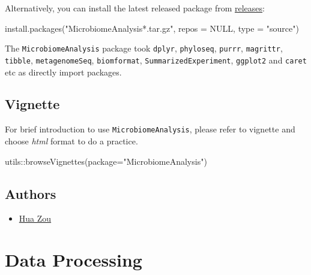 \documentclass[
]{book}
\newenvironment{Shaded}{\begin{snugshade}}{\end{snugshade}}
\newcommand{\AttributeTok}[1]{\textcolor[rgb]{0.77,0.63,0.00}{#1}}
\newcommand{\ConstantTok}[1]{\textcolor[rgb]{0.00,0.00,0.00}{#1}}
\newcommand{\FunctionTok}[1]{\textcolor[rgb]{0.00,0.00,0.00}{#1}}
\newcommand{\NormalTok}[1]{#1}
\newcommand{\SpecialCharTok}[1]{\textcolor[rgb]{0.00,0.00,0.00}{#1}}
\newcommand{\StringTok}[1]{\textcolor[rgb]{0.31,0.60,0.02}{#1}}
\providecommand{\tightlist}{%
  \setlength{\itemsep}{0pt}\setlength{\parskip}{0pt}}
\begin{document}
Alternatively, you can install the latest released package from \href{https://github.com/HuaZou/MicrobiomeAnalysis/releases}{releases}:

\begin{Shaded}
\begin{Highlighting}[]
\FunctionTok{install.packages}\NormalTok{(}\StringTok{"MicrobiomeAnalysis*.tar.gz"}\NormalTok{, }\AttributeTok{repos =} \ConstantTok{NULL}\NormalTok{, }\AttributeTok{type =} \StringTok{"source"}\NormalTok{)}
\end{Highlighting}
\end{Shaded}

The \texttt{MicrobiomeAnalysis} package took \texttt{dplyr}, \texttt{phyloseq}, \texttt{purrr}, \texttt{magrittr}, \texttt{tibble}, \texttt{metagenomeSeq}, \texttt{biomformat}, \texttt{SummarizedExperiment}, \texttt{ggplot2} and \texttt{caret} etc as directly import packages.

\hypertarget{vignette}{%
\section{Vignette}\label{vignette}}

For brief introduction to use \texttt{MicrobiomeAnalysis}, please refer to vignette and choose \emph{html} format to do a practice.

\begin{Shaded}
\begin{Highlighting}[]
\NormalTok{utils}\SpecialCharTok{::}\FunctionTok{browseVignettes}\NormalTok{(}\AttributeTok{package=}\StringTok{"MicrobiomeAnalysis"}\NormalTok{)}
\end{Highlighting}
\end{Shaded}

\hypertarget{authors}{%
\section{Authors}\label{authors}}

\begin{itemize}
\tightlist
\item
  \href{mailto:zouhua1@outlook.com}{Hua Zou}
\end{itemize}

\hypertarget{data-processing}{%
\chapter{Data Processing}\label{data-processing}}
\end{document}
